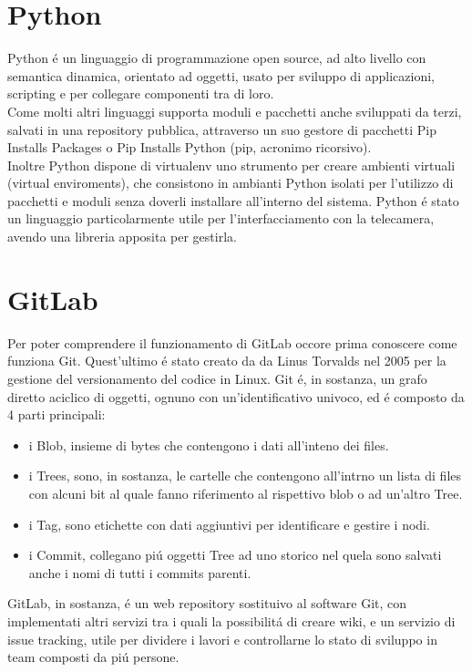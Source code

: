 \section{Python}
Python \'e un linguaggio di programmazione open source, ad alto livello con semantica dinamica, orientato ad oggetti, usato
per sviluppo di applicazioni, scripting e per collegare componenti tra di loro.\\[1\baselineskip]
Come molti altri linguaggi supporta moduli e pacchetti anche sviluppati da terzi, salvati in una repository pubblica,
attraverso un suo gestore di pacchetti Pip Installs Packages o Pip Installs Python (pip, acronimo ricorsivo).
\\[1\baselineskip]
Inoltre Python dispone di virtualenv uno strumento per creare ambienti virtuali (virtual enviroments), che consistono in ambianti Python
isolati per l'utilizzo di pacchetti e moduli senza doverli installare all'interno del sistema.
Python \'e stato un linguaggio particolarmente utile per l'interfacciamento con la telecamera, avendo una libreria
apposita per gestirla.
\\[2\baselineskip]

\section{GitLab}
Per poter comprendere il funzionamento di GitLab occore prima conoscere come funziona Git. Quest'ultimo \'e stato
creato da da Linus Torvalds nel 2005 per la gestione del versionamento del codice in Linux.
Git \'e, in sostanza, un grafo diretto aciclico di oggetti, ognuno con un'identificativo univoco, ed \'e composto da 4 parti principali:
\begin{itemize}
\item i Blob, insieme di bytes che contengono i dati all'inteno dei files.
\item i Trees, sono, in sostanza, le cartelle che contengono all'intrno un lista di files con alcuni bit al quale fanno riferimento al
rispettivo blob o ad un'altro Tree.
\item i Tag, sono etichette con dati aggiuntivi per identificare e gestire i nodi.
\item i Commit, collegano pi\'u oggetti Tree ad uno storico nel quela sono salvati anche i nomi di tutti i commits parenti.
\end{itemize}
GitLab, in sostanza, \'e un web repository sostituivo al software Git, con implementati altri
servizi tra i quali la possibilit\'a di creare wiki, e un servizio di issue tracking, utile
per dividere i lavori e controllarne lo stato di sviluppo in team composti da pi\'u persone.

